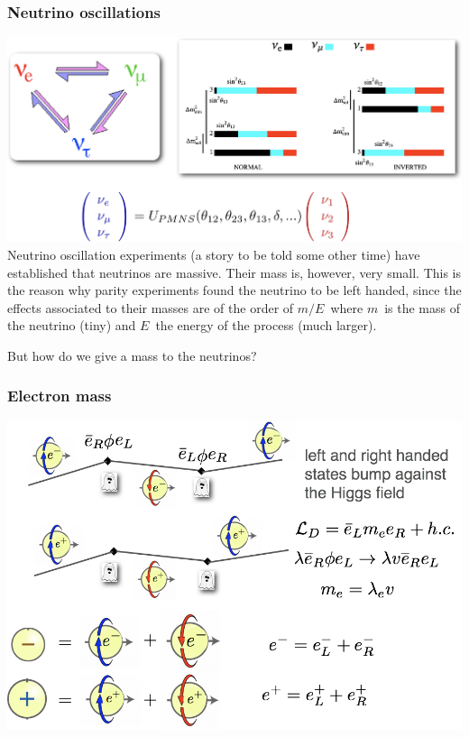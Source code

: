 \begin{frame}
\frametitle{Neutrino oscillations}
\includegraphics[scale=0.30]{img/neutrinoOscillations.png}
Neutrino oscillation experiments (a story to be told some other time) have established that neutrinos are massive. Their mass is, however, very small. This is the reason why parity experiments found the neutrino to be left handed, since the effects associated to their masses are of the order of $m/E$~where $m$~is the mass of the neutrino (tiny) and $E$~the energy of the process (much larger). 

\alert{But how do we give a mass to the neutrinos?} 

\end{frame}

\begin{frame}
\frametitle{Electron mass}
\includegraphics[scale=0.30]{img/ElectronMass.png}
\end{frame}

